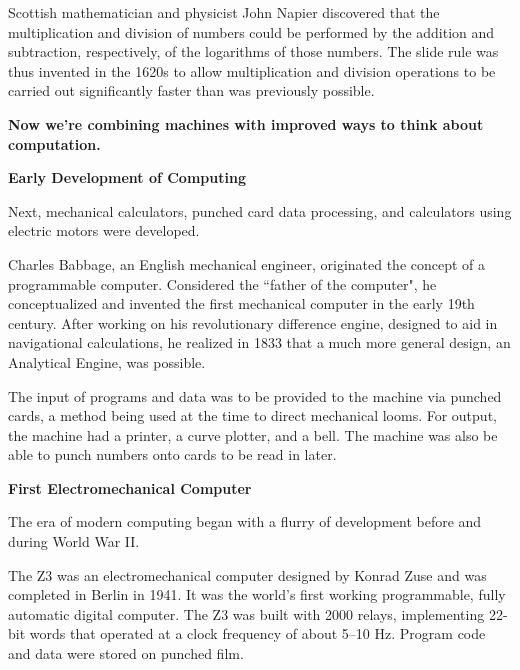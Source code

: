 \documentclass[12pt]{article}
\begin{document}
Scottish mathematician and physicist John Napier discovered that the multiplication and division of numbers could be performed by the addition and subtraction, respectively, of the logarithms of those numbers. The slide rule was thus invented in the 1620s to allow multiplication and division operations to be carried out significantly faster than was previously possible. 

\textbf{Now we're combining machines with improved ways to think about computation.}


\vspace*{2em}
\noindent \textbf{Early Development of Computing}

Next, mechanical calculators, punched card data processing, and calculators using electric motors were developed. 

Charles Babbage, an English mechanical engineer, originated the concept of a programmable computer. Considered the ``father of the computer", he conceptualized and invented the first mechanical computer in the early 19th century. After working on his revolutionary difference engine, designed to aid in navigational calculations, he realized in 1833 that a much more general design, an Analytical Engine, was possible. 

The input of programs and data was to be provided to the machine via punched cards, a method being used at the time to direct mechanical looms. For output, the machine had a printer, a curve plotter, and a bell. The machine was also be able to punch numbers onto cards to be read in later. 

\vspace*{2em}
\noindent \textbf{First Electromechanical Computer}

The era of modern computing began with a flurry of development before and during World War II. 

The Z3 was an electromechanical computer designed by Konrad Zuse and was completed in Berlin in 1941. It was the world's first working programmable, fully automatic digital computer. The Z3 was built with 2000 relays, implementing 22-bit words that operated at a clock frequency of about 5–10 Hz. Program code and data were stored on punched film. %
\end{document}
